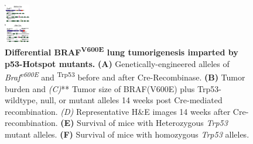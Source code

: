 \begin{figure}
\hypertarget{fig:11}{%
\centering
\includegraphics[width=0.1\textwidth,height=\textheight]{images/p53_1.png}
\caption{\textbf{Differential BRAF\textsuperscript{V600E} lung tumorigenesis imparted by p53-Hotspot mutants.} \textbf{(A)} Genetically-engineered alleles of \emph{Braf\textsuperscript{v600E}} and \textsuperscript{Trp53} before and after Cre-Recombinase. \textbf{(B)} Tumor burden and \emph{(C)}** Tumor size of BRAF(V600E) plus Trp53-wildtype, null, or mutant alleles 14 weeks post Cre-mediated recombination. \emph{(D)} Representative H\&E images 14 weeks after Cre-recombination. \textbf{(E)} Survival of mice with Heterozygous \emph{Trp53} mutant alleles. \textbf{(F)} Survival of mice with homozygous \emph{Trp53} alleles.}\label{fig:11}
}
\end{figure}

